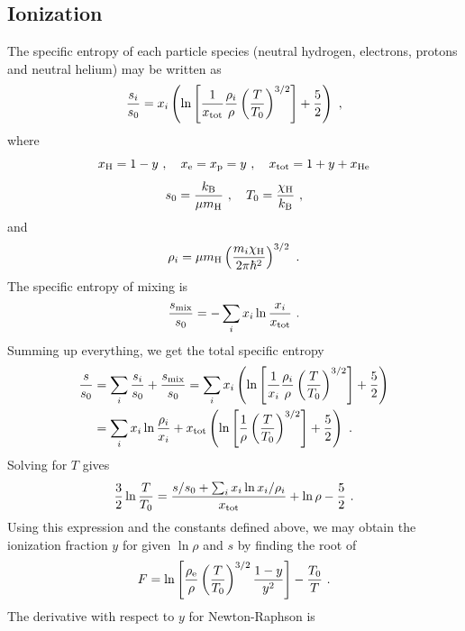 \documentclass[\mydriver,12pt,twoside,notitlepage,a4paper]{article}
\begin{document}
\subsection{Ionization}
\label{S-Ioni}

The specific entropy of each particle species (neutral hydrogen, electrons, protons and neutral helium) may be written as
\begin{equation}
\frac{s_i}{s_0}=x_i\left(\ln\left[\frac{1}{x_{\rm tot}}
\frac{\rho_i}{\rho}\left(\frac{T}{T_0}\right)^{3/2}\right]
+\frac{5}{2}\right)\ ,
\end{equation}
where
\begin{equation}
x_{\rm H}=1-y\ ,\quad x_{\rm e}=x_{\rm p}=y\ ,\quad x_{\rm tot}=1+y+x_{\rm He}
\end{equation}
\begin{equation}
s_0=\frac{k_{\rm B}}{\mu m_{\rm H}}\ ,\quad
T_0=\frac{\chi_{\rm H}}{k_{\rm B}}\ ,
\end{equation}
and
\begin{equation}
\rho_i=\mu m_{\rm H}\left(\frac{m_i\chi_{\rm H}}{2\pi\hbar^2}\right)^{3/2}\ .
\end{equation}
The specific entropy of mixing is
\begin{equation}
\frac{s_{\rm mix}}{s_0}=-\sum_ix_i\ln\frac{x_i}{x_{\rm tot}}\ .
\end{equation}
Summing up everything, we get the total specific entropy
\begin{align}
\frac{s}{s_0}&=\sum_i\frac{s_i}{s_0}+\frac{s_{\rm mix}}{s_0}
=\sum_ix_i\left(\ln\left[\frac{1}{x_i}\frac{\rho_i}{\rho}
\left(\frac{T}{T_0}\right)^{3/2}\right]+\frac{5}{2}\right)\\
&=\sum_ix_i\ln\frac{\rho_i}{x_i}
+x_{\rm tot}\left(\ln\left[\frac{1}{\rho}
\left(\frac{T}{T_0}\right)^{3/2}\right]+\frac{5}{2}\right)\ .
\end{align}
Solving for $T$ gives
\begin{equation}
\frac{3}{2}\ln\frac{T}{T_0}=\frac{s/s_0
+\sum_ix_i\ln x_i/\rho_i}{x_{\rm tot}}
+\ln\rho-\frac{5}{2}\ .
\end{equation}
Using this expression and the constants defined above, we may obtain the
ionization fraction $y$ for given $\ln\rho$ and $s$ by finding the root of
\begin{equation}
F=\ln\left[\frac{\rho_{\rm e}}{\rho}\left(\frac{T}{T_0}\right)^{3/2}
           \frac{1-y}{y^2}\right]-\frac{T_0}{T}\ .
\end{equation}
The derivative with respect to $y$ for Newton-Raphson is
\end{document}
